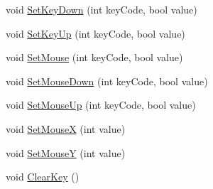 \begin{DoxyCompactItemize}
\item 
void \hyperlink{class_input_ac83ed2996d6c4da56c61f09df8be9e29}{Set\+Key\+Down} (int key\+Code, bool value)
\item 
void \hyperlink{class_input_a151b6918fcd7a9df4d2c83f3ad2978d8}{Set\+Key\+Up} (int key\+Code, bool value)
\item 
void \hyperlink{class_input_ad6ceb534e21a386fe70f2f3c1043347f}{Set\+Mouse} (int key\+Code, bool value)
\item 
void \hyperlink{class_input_a695f2b0b5177dd26fa67c8bfc5938ff8}{Set\+Mouse\+Down} (int key\+Code, bool value)
\item 
void \hyperlink{class_input_a34d2f3c09790e9a4495c55b51ecf79c7}{Set\+Mouse\+Up} (int key\+Code, bool value)
\item 
void \hyperlink{class_input_a4f215316de54413676961fe13210a088}{Set\+Mouse\+X} (int value)
\item 
void \hyperlink{class_input_ac83aa554129b665f4f458c6811dc7eea}{Set\+Mouse\+Y} (int value)
\item 
void \hyperlink{class_input_ad6f85521d7e38ed652edf01f3d666c14}{Clear\+Key} ()
\end{DoxyCompactItemize}


